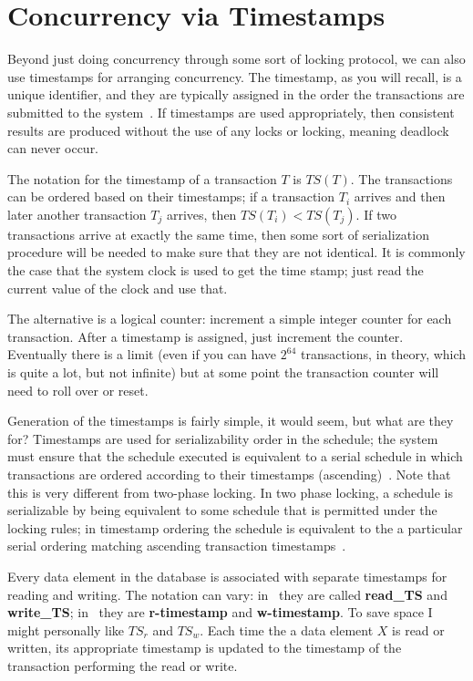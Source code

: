 \documentclass[a4paper]{report}
\begin{document}

\section*{Concurrency via Timestamps}

Beyond just doing concurrency through some sort of locking protocol, we can also use timestamps for arranging concurrency. The timestamp, as you will recall, is a unique identifier, and they are typically assigned in the order the transactions are submitted to the system~\cite{fds}. If timestamps are used appropriately, then consistent results are produced without the use of any locks or locking, meaning deadlock can never occur.

The notation for the timestamp of a transaction $T$ is $T\!S(T)$. The transactions can be ordered based on their timestamps; if a transaction $T_{i}$ arrives and then later another transaction $T_{j}$ arrives, then $T\!S(T_{i}) < T\!S(T_{j})$. If two transactions arrive at exactly the same time, then some sort of serialization procedure will be needed to make sure that they are not identical. It is commonly the case that the system clock is used to get the time stamp; just read the current value of the clock and use that.

The alternative is a logical counter: increment a simple integer counter for each transaction. After a timestamp is assigned, just increment the counter. Eventually there is a limit (even if you can have $2^{64}$ transactions, in theory, which is quite a lot, but not infinite) but at some point the transaction counter will need to roll over or reset.

Generation of the timestamps is fairly simple, it would seem, but what are they for? Timestamps are used for serializability order in the schedule; the system must ensure that the schedule executed is equivalent to a serial schedule in which transactions are ordered according to their timestamps (ascending)~\cite{dsc}. Note that this is very different from two-phase locking. In two phase locking, a schedule is serializable by being equivalent to some schedule that is permitted under the locking rules; in timestamp ordering the schedule is equivalent to the a particular serial ordering matching ascending transaction timestamps~\cite{fds}.

Every data element in the database is associated with separate timestamps for reading and writing. The notation can vary: in~\cite{fds} they are called \textbf{read\_TS} and \textbf{write\_TS}; in~\cite{dsc} they are \textbf{r-timestamp} and \textbf{w-timestamp}. To save space I might personally like $T\!S_{r}$ and $T\!S_{w}$. Each time the a data element $X$ is read or written, its appropriate timestamp is updated to the timestamp of the transaction performing the read or write.
\end{document}
